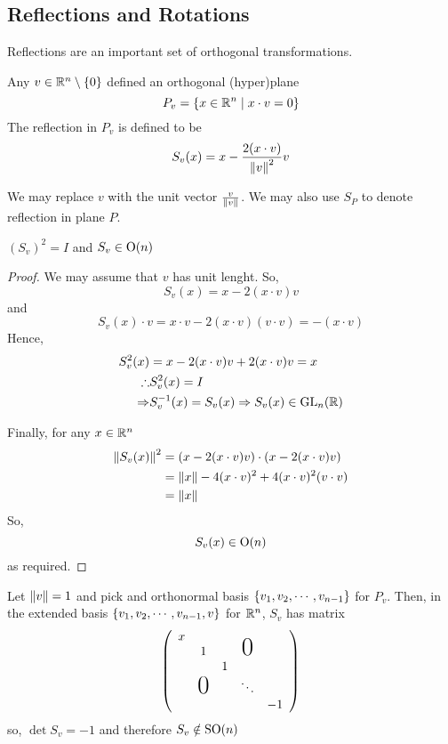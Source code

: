 \documentclass{article}
\begin{document}
\subsection{Reflections and Rotations}
Reflections are an important set of orthogonal transformations.
\begin{defi}[Reflection]
    Any $v \in \mathbb{R}^n \setminus \left\{ 0 \right\}$ defined an orthogonal (hyper)plane
    \[
        P_v = \left\{ x \in \mathbb{R}^n \mid x \cdot v = 0 \right\}  
    \]
    The reflection in $P_v$ is defined to be
    \[
        S_v(x) = x - \frac{2(x \cdot v)}{\left\lVert v\right\rVert^2} v  
    \]
\end{defi}
\begin{remark}
    We may replace $v$ with the unit vector $\frac{v}{\left\lVert v\right\rVert}$.
    We may also use $S_P$ to denote reflection in plane $P$.
\end{remark}

\begin{lemma}
    $(S_v)^2 = I$ and $S_v \in \mathrm{O}(n)$
\end{lemma}
\begin{proof}
    We may assume that $v$ has unit lenght. So,
    \[
        S_v(x) = x - 2(x \cdot v) v
    \]
    and
    \[
        S_v(x) \cdot v = x \cdot v - 2 (x \cdot v) (v \cdot v) = - (x \cdot v)  
    \]
    Hence,
    \begin{align*}
        S^2_v(x) &= x - 2(x \cdot v) v + 2(x \cdot v)v = x \\
        \therefore & S^2_v(x) = I \\
        \Rightarrow & S^{-1}_v(x) = S_v(x) \Rightarrow S_v(x) \in \mathrm{GL}_n(\mathbb{R})
    \end{align*}

    Finally, for any $x \in \mathbb{R}^n$
    \begin{align*}
        \left\lVert S_v(x)\right\rVert^2 &= (x - 2(x \cdot v) v) \cdot (x - 2(x \cdot v) v) \\
        &= \left\lVert x\right\rVert - 4 (x \cdot v)^2 + 4 (x \cdot v)^2 (v \cdot v) \\\
        &= \left\lVert x\right\rVert
    \end{align*}
    So,
    \[
        S_v(x) \in \mathrm{O}(n)
    \]
    as required.
\end{proof}
\begin{remark}
    Let $\left\lVert v\right\rVert = 1$ and pick and orthonormal basis $\left\{ v_1, v_2, \cdots, v_{n-1} \right\}$ for $P_v$.
    Then, in the extended basis $\left\{ v_1, v_2, \cdots, v_{n-1}, v \right\}$ for $\mathbb{R}^n$, $S_v$ has matrix
    \[
        \bkt{
            \begin{array}{ccccc}
                x                                                    \\
                  & 1                     &  & \smash{\text{\huge0}} \\
                  &                       & 1                        \\
                  & \smash{\text{\huge0}} &   & \ddots               \\
                  &                       &   &   & -1
            \end{array}
        }  
    \]
    so, $\det S_v = -1$ and therefore $S_v \notin \mathrm{SO}(n)$
\end{remark}
\end{document}
